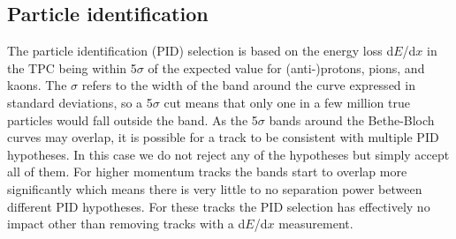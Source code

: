 
  \subsection{Particle identification}
    The particle identification (PID) selection is based on the energy loss d$E$/d$x$ in the TPC being within 5$\sigma$ of the expected value for (anti-)protons, pions, and kaons. The $\sigma$ refers to the width of the band around the curve expressed in standard deviations, so a 5$\sigma$ cut means that only one in a few million true particles would fall outside the band. As the 5$\sigma$ bands around the Bethe-Bloch curves may overlap, it is possible for a track to be consistent with multiple PID hypotheses. In this case we do not reject any of the hypotheses but simply accept all of them. For higher momentum tracks the bands start to overlap more significantly which means there is very little to no separation power between different PID hypotheses. For these tracks the PID selection has effectively no impact other than removing tracks with a  d$E$/d$x$ measurement.
    
